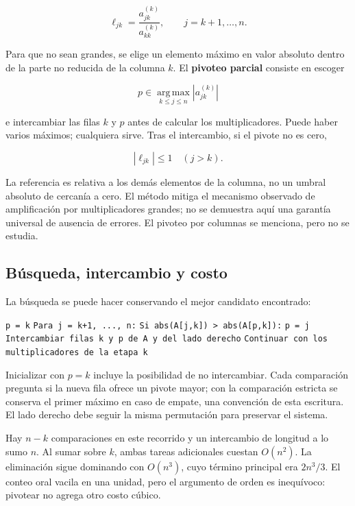 \documentclass[12pt,a4paper]{article}
\begin{document}
\[
\ell_{jk}=\frac{a_{jk}^{(k)}}{a_{kk}^{(k)}},\qquad j=k+1,\ldots,n.
\]

Para que no sean grandes, se elige un elemento máximo en valor absoluto dentro de la parte no reducida de la columna $k$. El \textbf{pivoteo parcial} consiste en escoger

\[
p\in\operatorname*{arg\,max}_{k\le j\le n}|a_{jk}^{(k)}|
\]

 e intercambiar las filas $k$ y $p$ antes de calcular los multiplicadores. Puede haber varios máximos; cualquiera sirve. Tras el intercambio, si el pivote no es cero,

\[
\boxed{|\ell_{jk}|\le1\quad(j>k)}.
\]

La referencia es relativa a los demás elementos de la columna, no un umbral absoluto de cercanía a cero. El método mitiga el mecanismo observado de amplificación por multiplicadores grandes; no se demuestra aquí una garantía universal de ausencia de errores. El pivoteo por columnas se menciona, pero no se estudia.

\subsection{Búsqueda, intercambio y costo}

La búsqueda se puede hacer conservando el mejor candidato encontrado:

\begin{algorithm}[H]
\small\DontPrintSemicolon
\hspace*{0.0em}\texttt{p = k}\;
\hspace*{0.0em}\texttt{Para j = k+1, ..., n:}\;
\hspace*{0.7em}\texttt{Si abs(A[j,k]) > abs(A[p,k]):}\;
\hspace*{1.4em}\texttt{p = j}\;
\hspace*{0.0em}\texttt{Intercambiar filas k y p de A y del lado derecho}\;
\hspace*{0.0em}\texttt{Continuar con los multiplicadores de la etapa k}\;
\end{algorithm}

Inicializar con $p=k$ incluye la posibilidad de no intercambiar. Cada comparación pregunta si la nueva fila ofrece un pivote mayor; con la comparación estricta se conserva el primer máximo en caso de empate, una convención de esta escritura. El lado derecho debe seguir la misma permutación para preservar el sistema.

Hay $n-k$ comparaciones en este recorrido y un intercambio de longitud a lo sumo $n$. Al sumar sobre $k$, ambas tareas adicionales cuestan $O(n^2)$. La eliminación sigue dominando con $O(n^3)$, cuyo término principal era $2n^3/3$. El conteo oral vacila en una unidad, pero el argumento de orden es inequívoco: pivotear no agrega otro costo cúbico.
\end{document}
